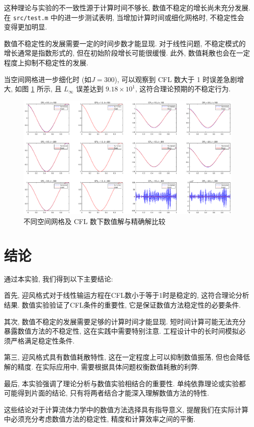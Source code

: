 \documentclass[12pt,a4paper]{article}
\begin{document}
            这种理论与实验的不一致性源于计算时间不够长, 数值不稳定的增长尚未充分发展. 在 \texttt{src/test.m} 中的进一步测试表明, 当增加计算时间或细化网格时, 不稳定性会变得更加明显.

            数值不稳定性的发展需要一定的时间步数才能显现. 对于线性问题, 不稳定模式的增长通常是指数形式的, 但在初始阶段增长可能很缓慢. 此外, 数值耗散也会在一定程度上抑制不稳定性的发展.

            当空间网格进一步细化时 (如$J=300$), 可以观察到 CFL 数大于 1 时误差急剧增大, 如图 \ref{fig:result_compare} 所示, 且 $L_{\infty}$ 误差达到 $9.18\times10^1$, 这符合理论预期的不稳定行为.

            \begin{figure}[H]
                \centering
                \includegraphics[width=\textwidth]{fig/result_compare.eps}
                \caption{不同空间网格及 CFL 数下数值解与精确解比较}
                \label{fig:result_compare}
            \end{figure}

    \section{结论}
        通过本实验, 我们得到以下主要结论:

        首先, 迎风格式对于线性输运方程在CFL数小于等于1时是稳定的, 这符合理论分析结果. 数值实验验证了CFL条件的重要性, 它是保证数值方法稳定性的必要条件.

        其次, 数值不稳定的发展需要足够的计算时间才能显现. 短时间计算可能无法充分暴露数值方法的不稳定性, 这在实践中需要特别注意. 工程设计中的长时间模拟必须严格满足稳定性条件.

        第三, 迎风格式具有数值耗散特性, 这在一定程度上可以抑制数值振荡, 但也会降低解的精度. 在实际应用中, 需要根据具体问题权衡数值耗散的利弊.

        最后, 本实验强调了理论分析与数值实验相结合的重要性. 单纯依靠理论或实验都可能得到片面的结论, 只有将两者结合才能深入理解数值方法的特性.

        这些结论对于计算流体力学中的数值方法选择具有指导意义, 提醒我们在实际计算中必须充分考虑数值方法的稳定性, 精度和计算效率之间的平衡.
\end{document}
